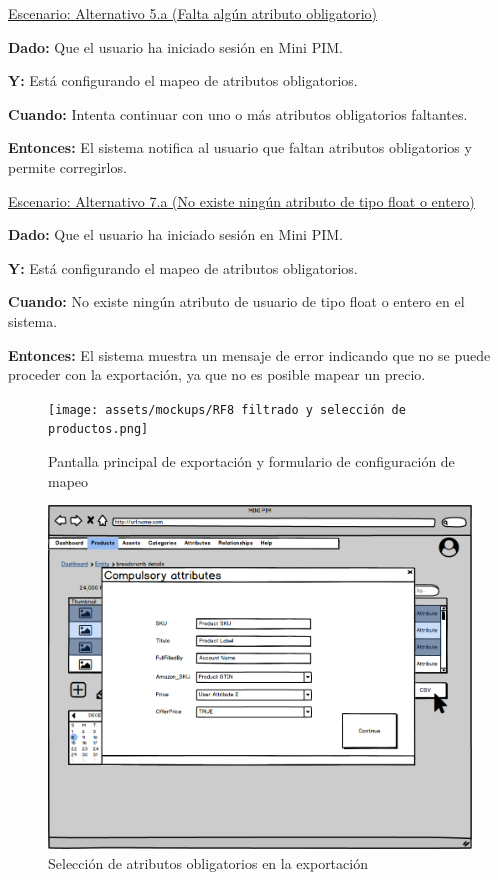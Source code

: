\underline{Escenario: Alternativo 5.a (Falta algún atributo obligatorio)}\par
\textbf{Dado:} Que el usuario ha iniciado sesión en Mini PIM.  \par
\textbf{Y:} Está configurando el mapeo de atributos obligatorios.  \par
\textbf{Cuando:} Intenta continuar con uno o más atributos obligatorios faltantes.  \par
\textbf{Entonces:} El sistema notifica al usuario que faltan atributos obligatorios y permite corregirlos.\par
\vspace{0.15cm}
\underline{Escenario: Alternativo 7.a (No existe ningún atributo de tipo float o entero)}\par
\textbf{Dado:} Que el usuario ha iniciado sesión en Mini PIM.  \par
\textbf{Y:} Está configurando el mapeo de atributos obligatorios.  \par
\textbf{Cuando:} No existe ningún atributo de usuario de tipo float o entero en el sistema.  \par
\textbf{Entonces:} El sistema muestra un mensaje de error indicando que no se puede proceder con la exportación, ya que no es posible mapear un precio.\par

\begin{figure}[H]
    \texttt{[image: assets/mockups/RF8 filtrado y selección de productos.png]}
    \caption{Pantalla principal de exportación y formulario de configuración de mapeo}
\end{figure}


\begin{figure}[H]
    \includegraphics[width=1\linewidth]{assets/mockups/RF8 Seleccion de atributos obligatorios.png}
    \caption{Selección de atributos obligatorios en la exportación}
\end{figure}

